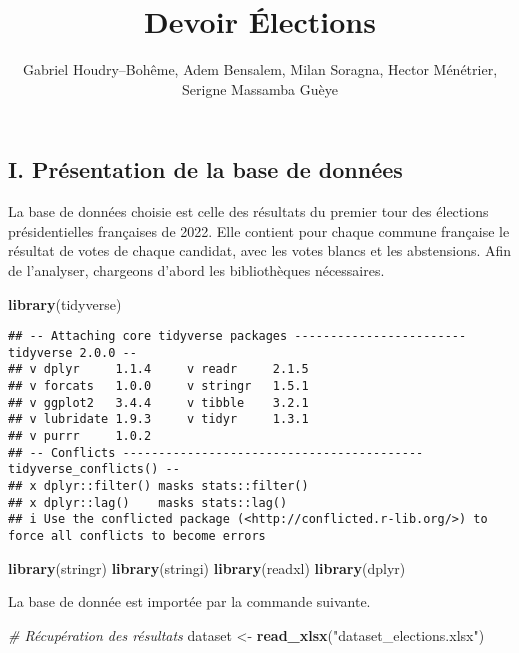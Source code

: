 \documentclass[
]{article}
\title{Devoir Élections}
\author{Gabriel Houdry--Bohême, Adem Bensalem, Milan Soragna, Hector
Ménétrier, Serigne Massamba Guèye}
\date{}
\newenvironment{Shaded}{\begin{snugshade}}{\end{snugshade}}
\newcommand{\CommentTok}[1]{\textcolor[rgb]{0.56,0.35,0.01}{\textit{#1}}}
\newcommand{\FunctionTok}[1]{\textcolor[rgb]{0.13,0.29,0.53}{\textbf{#1}}}
\newcommand{\NormalTok}[1]{#1}
\newcommand{\OtherTok}[1]{\textcolor[rgb]{0.56,0.35,0.01}{#1}}
\newcommand{\StringTok}[1]{\textcolor[rgb]{0.31,0.60,0.02}{#1}}
\begin{document}
\maketitle

\hypertarget{i.-pruxe9sentation-de-la-base-de-donnuxe9es}{%
\subsection{I. Présentation de la base de
données}\label{i.-pruxe9sentation-de-la-base-de-donnuxe9es}}

La base de données choisie est celle des résultats du premier tour des
élections présidentielles françaises de 2022. Elle contient pour chaque
commune française le résultat de votes de chaque candidat, avec les
votes blancs et les abstensions. Afin de l'analyser, chargeons d'abord
les bibliothèques nécessaires.

\begin{Shaded}
\begin{Highlighting}[]
\FunctionTok{library}\NormalTok{(tidyverse)}
\end{Highlighting}
\end{Shaded}

\begin{verbatim}
## -- Attaching core tidyverse packages ------------------------ tidyverse 2.0.0 --
## v dplyr     1.1.4     v readr     2.1.5
## v forcats   1.0.0     v stringr   1.5.1
## v ggplot2   3.4.4     v tibble    3.2.1
## v lubridate 1.9.3     v tidyr     1.3.1
## v purrr     1.0.2     
## -- Conflicts ------------------------------------------ tidyverse_conflicts() --
## x dplyr::filter() masks stats::filter()
## x dplyr::lag()    masks stats::lag()
## i Use the conflicted package (<http://conflicted.r-lib.org/>) to force all conflicts to become errors
\end{verbatim}

\begin{Shaded}
\begin{Highlighting}[]
\FunctionTok{library}\NormalTok{(stringr)}
\FunctionTok{library}\NormalTok{(stringi)}
\FunctionTok{library}\NormalTok{(readxl)}
\FunctionTok{library}\NormalTok{(dplyr)}
\end{Highlighting}
\end{Shaded}

La base de donnée est importée par la commande suivante.

\begin{Shaded}
\begin{Highlighting}[]
\CommentTok{\# Récupération des résultats}
\NormalTok{dataset }\OtherTok{\textless{}{-}} \FunctionTok{read\_xlsx}\NormalTok{(}\StringTok{"dataset\_elections.xlsx"}\NormalTok{)}
\end{Highlighting}
\end{Shaded}
\end{document}
